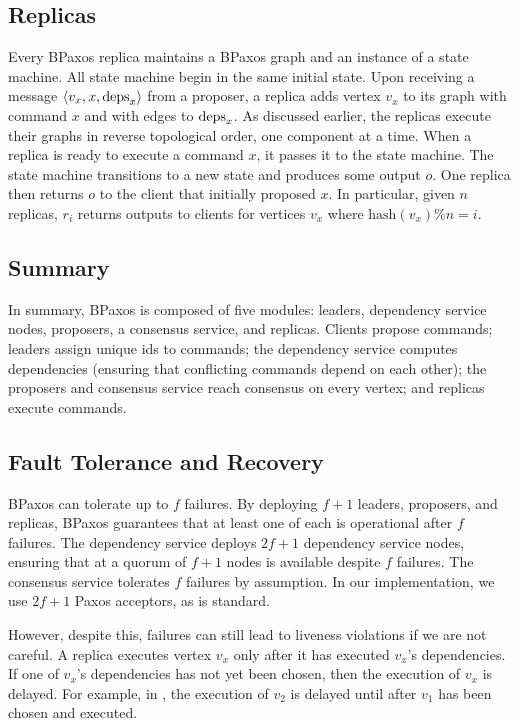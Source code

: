 \subsection{Replicas}
Every BPaxos replica maintains a BPaxos graph and an instance of a state
machine. All state machine begin in the same initial state. Upon receiving a
message $\langle v_x, x, \text{deps}_x \rangle$ from a proposer, a replica adds vertex $v_x$
to its graph with command $x$ and with edges to $\text{deps}_x$. As discussed
earlier, the replicas execute their graphs in reverse topological order, one
component at a time. When a replica is ready to execute a command $x$, it
passes it to the state machine. The state machine transitions to a new state
and produces some output $o$. One replica then returns $o$ to the client that
initially proposed $x$. In particular, given $n$ replicas, $r_i$ returns
outputs to clients for vertices $v_x$ where $\text{hash}(v_x) \% n = i$.

\subsection{Summary}
In summary, BPaxos is composed of five modules: leaders, dependency service
nodes, proposers, a consensus service, and replicas. Clients propose commands;
leaders assign unique ids to commands; the dependency service computes
dependencies (ensuring that conflicting commands depend on each other); the
proposers and consensus service reach consensus on every vertex; and replicas
execute commands.

\subsection{Fault Tolerance and Recovery}
BPaxos can tolerate up to $f$ failures. By deploying $f+1$ leaders, proposers,
and replicas, BPaxos guarantees that at least one of each is operational after
$f$ failures. The dependency service deploys $2f+1$ dependency service nodes,
ensuring that at a quorum of $f+1$ nodes is available despite $f$ failures. The
consensus service tolerates $f$ failures by assumption. In our implementation,
we use $2f+1$ Paxos acceptors, as is standard.

However, despite this, failures can still lead to liveness violations if we are
not careful. A replica executes vertex $v_x$ only after it has executed $v_x$'s
dependencies. If one of $v_x$'s dependencies has not yet been chosen, then the
execution of $v_x$ is delayed. For example, in ,
the execution of $v_2$ is delayed until after $v_1$ has been chosen and
executed.

